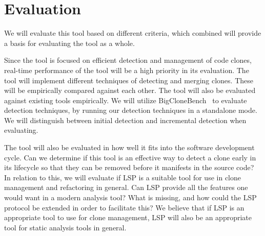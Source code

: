 \chapter{Evaluation}


We will evaluate this tool based on different criteria, which combined will provide a
basis for evaluating the tool as a whole.

Since the tool is focused on efficient detection and management of code clones, real-time
performance of the tool will be a high priority in its evaluation. The tool will implement
different techniques of detecting and merging clones. These will be empirically compared
against each other. The tool will also be evaluated against existing tools empirically. We
will utilize BigCloneBench~\cite{BigCloneBench} to evaluate detection techniques, by
running our detection techniques in a standalone mode. We will distinguish between initial
detection and incremental detection when evaluating.

The tool will also be evaluated in how well it fits into the software development cycle.
Can we determine if this tool is an effective way to detect a clone early in its lifecycle
so that they can be removed before it manifests in the source code? In relation to this,
we will evaluate if LSP is a suitable tool for use in clone management and refactoring in
general. Can LSP provide all the features one would want in a modern analysis tool? What
is missing, and how could the LSP protocol be extended in order to facilitate this? We
believe that if LSP is an appropriate tool to use for clone management, LSP will also be
an appropriate tool for static analysis tools in general.

